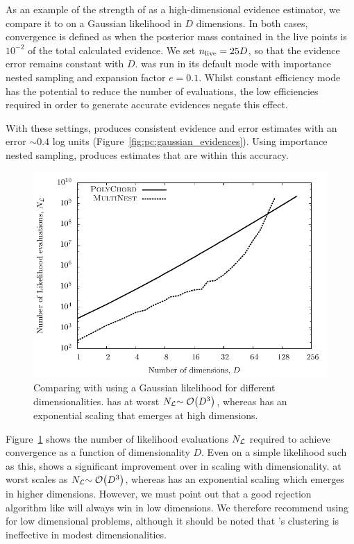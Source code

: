 As an example of the strength of \PolyChord{} as a high-dimensional evidence estimator, we compare it to \MultiNest{} on a Gaussian likelihood in \(D\) dimensions.  In both cases, convergence is defined as when the posterior mass contained in the live points is \(10^{-2}\) of the total calculated evidence.  We set \(n_{\mathrm{live}}=25D\), so that the evidence error remains constant with \(D\). \MultiNest{} was run in its default mode with importance nested sampling and expansion factor \(e=0.1\).  Whilst constant efficiency mode has the potential to reduce the number of \MultiNest{} evaluations, the low efficiencies required in order to generate accurate evidences negate this effect.                                       


With these settings, \PolyChord{} produces consistent evidence and error estimates with an error \(\sim0.4\) log units (Figure~\ref{fig:pc:gaussian_evidences}). Using importance nested sampling, \MultiNest{} produces estimates that are within this accuracy.

\begin{figure}[tp]
  \centering
  \includegraphics[width=\columnwidth]{chapters/polychord/figures/gaussian}
  \caption{Comparing \PolyChord{} with \MultiNest{} using a Gaussian likelihood for different dimensionalities. \PolyChord{} has at worst \(N_{\mathcal{L}}{\sim\mathcal{O}{\left(D^3\right)}}\), whereas \MultiNest{} has an exponential scaling that emerges at high dimensions.}\label{fig:pc:gaussian}
\end{figure}

Figure~\ref{fig:pc:gaussian} shows the number of likelihood evaluations \(N_{\mathcal{L}}\) required to achieve convergence as a function of dimensionality \(D\). 
Even on a simple likelihood such as this, \PolyChord{} shows a significant improvement over \MultiNest{} in scaling with dimensionality.  \PolyChord{} at worst scales as \({N_{\mathcal{L}}{\sim\mathcal{O}{\left(D^3\right)}}}\), whereas \MultiNest{} has an exponential scaling which emerges in higher dimensions.
However, we must point out that a good rejection algorithm like \MultiNest{} will always win in low dimensions. We therefore recommend using \MultiNest{} for low dimensional problems, although it should be noted that \MultiNest{}'s clustering is ineffective in modest dimensionalities.

